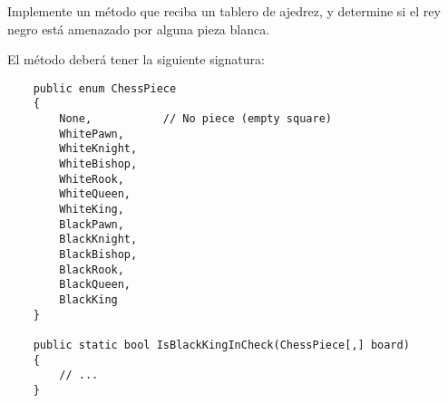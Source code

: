 Implemente un método que reciba un tablero de ajedrez, y determine si el rey negro está amenazado por alguna pieza blanca. 

El método deberá tener la siguiente signatura:

\begin{lstlisting}
    public enum ChessPiece
    {
        None,           // No piece (empty square)
        WhitePawn,
        WhiteKnight,
        WhiteBishop,
        WhiteRook,
        WhiteQueen,
        WhiteKing,
        BlackPawn,
        BlackKnight,
        BlackBishop,
        BlackRook,
        BlackQueen,
        BlackKing
    }
    
    public static bool IsBlackKingInCheck(ChessPiece[,] board)
    {
        // ...
    }
\end{lstlisting}
